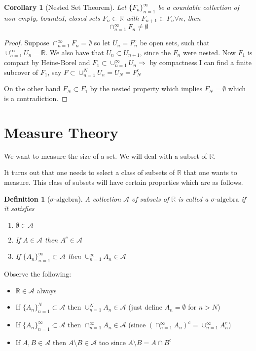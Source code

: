 \documentclass[11pt]{article}
\newtheorem{corollary}{Corollary}[theorem]
\newtheorem{definition}{Definition}[section]
\newcommand{\siga}{\sigma\text{-algebra}}
\begin{document}
    \begin{corollary}[Nested Set Theorem]
        Let $\{ F_n \}_{n=1}^{\infty}$ be a countable collection of non-empty, bounded, closed sets $F_n \subset \mathbb{R}$ with $F_{n+1} \subset F_n \forall n$, then
        \[
            \cap_{n=1}^{\infty} F_n \neq \emptyset
        \]
    \end{corollary}

    \begin{proof}
        Suppose $\cap_{n=1}^{\infty} F_n = \emptyset$ so let $U_n = F_{n}^{c}$ be open sets, such that $\cup_{n=1}^{\infty} U_n = \mathbb{R}$.
        We also have that $U_n \subset U_{n+1}$, since the $F_n$ were nested.
        Now $F_1$ is compact by Heine-Borel and $F_1 \subset \cup_{n=1}^{\infty} U_n \Rightarrow $ by compactness
        I can find a finite subcover of $F_1$, say $F \subset \cup_{n=1}^{N} U_n = U_N = F_N ^{c}$

        On the other hand $F_N \subset F_1$ by the nested property which implies $F_N = \emptyset$ which is a contradiction.
    \end{proof}

    \section{Measure Theory}\label{sec:measure-theory}

    We want to measure the size of a set.
    We will deal with a subset of $\mathbb{R}$.

    It turns out that one needs to select a class of subsets of $\mathbb{R}$ that one wants to measure.
    This class of subsets will have certain properties which are as follows.

    \begin{definition}[$\siga$]
        A collection $\mathcal{A}$ of subsets of $\mathbb{R}$ is called a $\siga$ if it satisfies
        \begin{enumerate}
            \item $\emptyset \in \mathcal{A}$
            \item If $A \in \mathcal{A}$ then $A^c \in \mathcal{A}$
            \item If $\{ A_n \}_{n=1}^{\infty} \subset \mathcal{A}$ then $\cup_{n=1}^{\infty} A_n \in \mathcal{A}$
        \end{enumerate}
    \end{definition}

    Observe the following:
    \begin{itemize}
        \item $\mathbb{R} \in \mathcal{A}$ always
        \item If $\{ A_n \}_{n=1}^{N} \subset \mathcal{A}$ then $\cup_{n=1}^{N} A_n \in \mathcal{A}$ (just define $A_n = \emptyset$ for $n > N$)
        \item If $\{ A_n \}_{n=1}^{\infty} \subset \mathcal{A}$ then $\cap_{n=1}^{\infty} A_n \in \mathcal{A}$ (since $(\cap_{n=1}^{\infty} A_n)^c = \cup_{n=1}^{\infty} A_{n}^{c}$)
        \item If $A,B \in \mathcal{A}$ then $A \setminus B \in \mathcal{A}$ too since $A \setminus B = A \cap B^c$
    \end{itemize}
\end{document}
